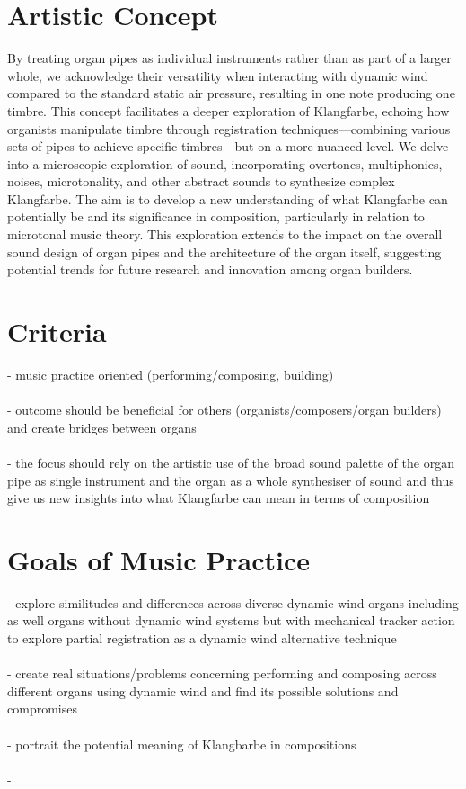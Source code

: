 
\section{Artistic Concept}

By treating organ pipes as individual instruments rather than as part of a larger whole, we acknowledge their versatility when interacting with dynamic wind compared to the standard static air pressure, resulting in one note producing one timbre. This concept facilitates a deeper exploration of Klangfarbe, echoing how organists manipulate timbre through registration techniques—combining various sets of pipes to achieve specific timbres—but on a more nuanced level. We delve into a microscopic exploration of sound, incorporating overtones, multiphonics, noises, microtonality, and other abstract sounds to synthesize complex Klangfarbe. The aim is to develop a new understanding of what Klangfarbe can potentially be and its significance in composition, particularly in relation to microtonal music theory. This exploration extends to the impact on the overall sound design of organ pipes and the architecture of the organ itself, suggesting potential trends for future research and innovation among organ builders.

\section{Criteria}

- music practice oriented (performing/composing, building)\\
\\
- outcome should be beneficial for others (organists/composers/organ builders) and create bridges between organs\\
\\
- the focus should rely on the artistic use of the broad sound palette of the organ pipe as single instrument and the organ as a whole synthesiser of sound and thus give us new insights into what Klangfarbe can mean in terms of composition \\

\section{Goals of Music Practice}

- explore similitudes and differences across diverse dynamic wind organs including as well organs without dynamic wind systems but with mechanical tracker action to explore partial registration as a dynamic wind alternative technique\\
\\
- create real situations/problems concerning performing and composing across different organs using dynamic wind and find its possible solutions and compromises\\
\\
- portrait the potential meaning of Klangbarbe in compositions\\
\\
- 
